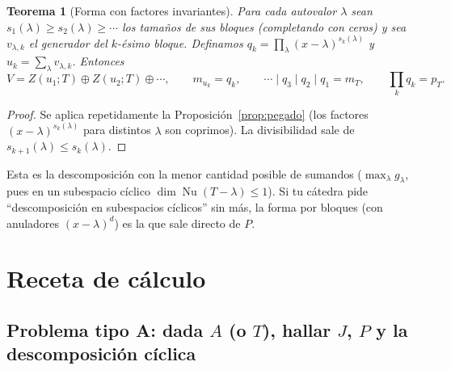 \documentclass{article}
\DeclareMathOperator{\Nu}{Nu}
\theoremstyle{plain}
\newtheorem{teorema}{Teorema}[section]
\theoremstyle{definition}
\theoremstyle{remark}
\begin{document}
\begin{teorema}[Forma con factores invariantes]\label{teo:invariantes}
    Para cada autovalor \(\lambda\) sean \(s_1(\lambda)\ge s_2(\lambda)\ge\cdots\) los tamaños de sus bloques (completando con ceros) y sea \(v_{\lambda,k}\) el generador del \(k\)-ésimo bloque. Definamos \(q_k=\prod_\lambda(x-\lambda)^{s_k(\lambda)}\) y \(u_k=\sum_\lambda v_{\lambda,k}\). Entonces
    \[
        V=Z(u_1;T)\oplus Z(u_2;T)\oplus\cdots,\qquad m_{u_k}=q_k,\qquad \cdots\mid q_3\mid q_2\mid q_1=m_T,\qquad \prod_kq_k=p_T.
    \]
\end{teorema}
\begin{proof}
    Se aplica repetidamente la Proposición~\ref{prop:pegado} (los factores \((x-\lambda)^{s_k(\lambda)}\) para distintos \(\lambda\) son coprimos). La divisibilidad sale de \(s_{k+1}(\lambda)\le s_k(\lambda)\).
\end{proof}
Esta es la descomposición con la menor cantidad posible de sumandos (\(\max_\lambda g_\lambda\), pues en un subespacio cíclico \(\dim\Nu(T-\lambda)\le1\)). Si tu cátedra pide ``descomposición en subespacios cíclicos'' sin más, la forma por bloques (con anuladores \((x-\lambda)^d\)) es la que sale directo de \(P\).

\section{Receta de cálculo}\label{sec:receta}

\subsection{Problema tipo A: dada \(A\) (o \(T\)), hallar \(J\), \(P\) y la descomposición cíclica}
\end{document}
